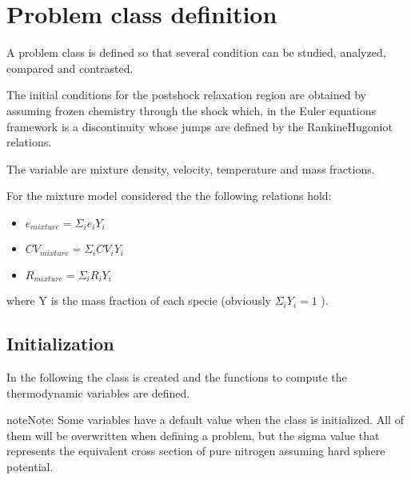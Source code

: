 \documentclass[letterpaper,10pt,english]{jupyterBook}
\begin{document}
\chapter{Problem class definition}
\label{\detokenize{1_Temperature/Problem_class_definition:problem-class-definition}}\label{\detokenize{1_Temperature/Problem_class_definition::doc}}
\sphinxAtStartPar
A problem class is defined so that several condition can be studied, analyzed, compared and contrasted.

\sphinxAtStartPar
The initial conditions for the post\sphinxhyphen{}shock relaxation region are obtained by assuming frozen chemistry through the shock which, in the Euler equations framework is a discontinuity whose jumps are defined by the Rankine\sphinxhyphen{}Hugoniot relations.

\sphinxAtStartPar
The variable are mixture density, velocity, temperature and mass fractions.

\sphinxAtStartPar
For the mixture model considered the the following relations hold:
\begin{itemize}
\item {} 
\sphinxAtStartPar
\(e_{mixture} = \Sigma_i e_i Y_i \)

\item {} 
\sphinxAtStartPar
\(CV_{mixture} = \Sigma_i CV_i Y_i \)

\item {} 
\sphinxAtStartPar
\(R_{mixture} = \Sigma_i R_i Y_i \)

\end{itemize}

\sphinxAtStartPar
where Y is the mass fraction of each specie (obviously \( \Sigma_i Y_i = 1\) ).


\section{Initialization}
\label{\detokenize{1_Temperature/Problem_class_definition:initialization}}
\sphinxAtStartPar
In the following the class is created and the functions to compute the thermodynamic variables are defined.

\begin{sphinxadmonition}{note}{Note:}
\sphinxAtStartPar
Some variables have a default value when the class is initialized. All of them will be overwritten when defining a problem, but the sigma value that represents the equivalent cross section of pure nitrogen assuming hard sphere potential.
\end{sphinxadmonition}
\end{document}
